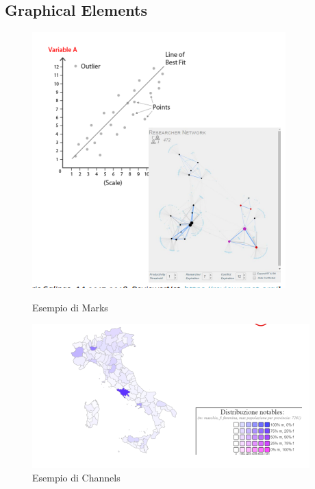 \subsection{Graphical Elements}
\begin{figure}[H]
    \centering
    \begin{minipage}{0.45\textwidth}
        \centering
        \includegraphics[width=\linewidth]{images/Marks.png} 
        \caption{Esempio di Marks}
        \label{fig:immagine1}
    \end{minipage}\hfill
    \begin{minipage}{0.45\textwidth}
        \centering
        \includegraphics[width=\linewidth]{images/Channels.png} %
        \caption{Esempio di Channels}
        \label{fig:immagine2}
    \end{minipage}
\end{figure}
